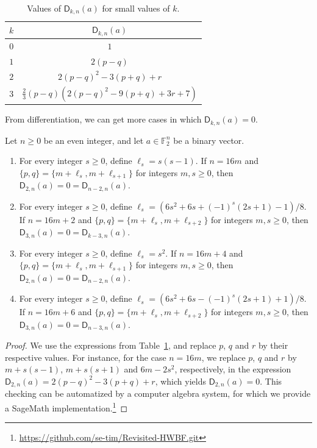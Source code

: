 \documentclass[runningheads,orivec]{llncs}
\newcommand{\Dkna}[3]{\mathsf{D}_{#2,#1}(a)}
\newcommand{\F}{\mathbb{F}}
\let\geq=\geqslant
\begin{document}
    \begin{table}
    	\scriptsize
    	\centering
        \caption{Values of $\Dkna{n}{k}{a}$ for small values of $k$.}\label{tab:Dkna_small_k}
    	\begin{tabular}{|c|c|}
    		\hline
    		$k$ & $\Dkna nka$\\
    		\hline
    		$0$&$1$\\
    		$1$&$2(p-q)$\\ 
    		$2$&$2(p-q)^2-3(p+q)+r$\\
    		$3$&$\frac 23(p-q)\left(2(p-q)^2-9(p+q)+3r+7\right)$\\
    		\hline
    	\end{tabular}
    \end{table}
    
    From differentiation, we can get more cases in which $\Dkna nka=0$.
    
    \begin{proposition}
        Let $n\geq 0$ be an even integer, and let $a\in\F_2^n$ be a binary vector.
        \begin{enumerate}
            \item For every integer $s\geq0$, define $\ell_s=s(s-1)$. If $n=16m$ and $\{p,q\}=\{m+\ell_s,m+\ell_{s+1}\}$ for integers $m,s\geq 0$, then $\Dkna n2a=0=\Dkna n{n-2}a$.
            \item For every integer $s\geq 0$, define $\ell_s=\left(6s^2+6s+(-1)^s(2s+1)-1\right)/8$. If $n=16m+2$ and $\{p,q\}=\{m+\ell_s,m+\ell_{s+2}\}$ for integers $m,s\geq 0$, then $\Dkna n3a=0=\Dkna n{k-3}a$.
            \item For every integer $s\geq 0$, define $\ell_s=s^2$. If $n=16m+4$ and $\{p,q\}=\{m+\ell_s,m+\ell_{s+1}\}$ for integers $m,s\geq 0$, then $\Dkna n2a=0=\Dkna n{n-2}a$.
            \item For every integer $s\geq 0$, define $\ell_s=\left(6s^2+6s-(-1)^s(2s+1)+1\right)/8$. If $n=16m+6$ and $\{p,q\}=\{m+\ell_s,m+\ell_{s+2}\}$ for integers $m,s\geq 0$, then $\Dkna n3a=0=\Dkna n{n-3}a$.
        \end{enumerate}
    \end{proposition}
    
    \begin{proof}
    	We use the expressions from Table~\ref{tab:Dkna_small_k}, and replace $p$, $q$ and $r$ by their respective values. For instance, for the case $n=16m$, we replace $p$, $q$ and $r$ by $m+s(s-1)$, $m+s(s+1)$ and $6m-2s^2$, respectively, in the expression $\Dkna n2a=2(p-q)^2-3(p+q)+r$, which yields $\Dkna n2a=0$. This checking can be automatized by a computer algebra system, for which we provide a \textsf{SageMath} implementation.\footnote{\url{https://github.com/se-tim/Revisited-HWBF.git}}
    \end{proof}
    
\end{document}
